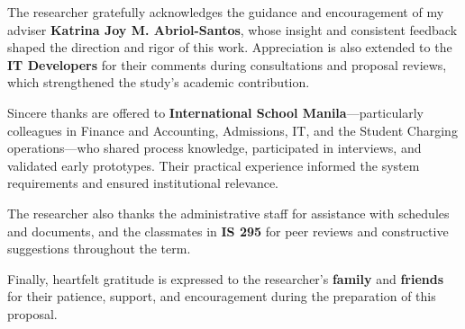 
\begin{acknowledgement}

The researcher gratefully acknowledges the guidance and encouragement of my adviser \textbf{Katrina Joy M. Abriol-Santos}, whose insight and consistent feedback shaped the direction and rigor of this work. Appreciation is also extended to the \textbf{IT Developers} for their comments during consultations and proposal reviews, which strengthened the study’s academic contribution.

Sincere thanks are offered to \textbf{International School Manila}—particularly colleagues in Finance and Accounting, Admissions, IT, and the Student Charging operations—who shared process knowledge, participated in interviews, and validated early prototypes. Their practical experience informed the system requirements and ensured institutional relevance.

The researcher also thanks the administrative staff for assistance with schedules and documents, and the classmates in \textbf{IS 295} for peer reviews and constructive suggestions throughout the term.

Finally, heartfelt gratitude is expressed to the researcher’s \textbf{family} and \textbf{friends} for their patience, support, and encouragement during the preparation of this proposal.

\end{acknowledgement}